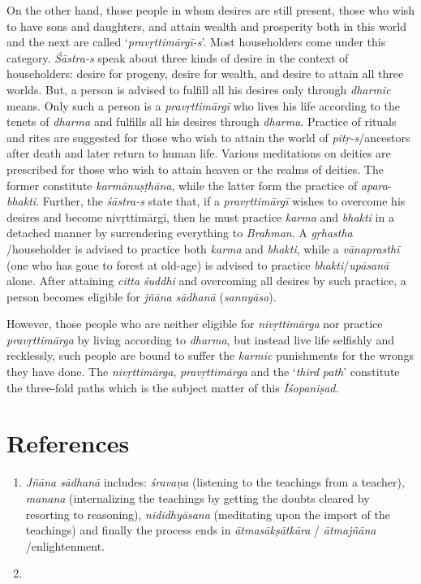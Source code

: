 On the other hand, those people in whom desires are still present, those who wish to have sons and daughters, and attain wealth and prosperity both in this world and the next are called `\emph{pravṛttimārgī-s}'. Most householders come under this category. \emph{Śāstra-s} speak about three kinds of desire in the context of householders: desire for progeny, desire for wealth, and desire to attain all three worlds. But, a person is advised to fulfill all his desires only through \emph{dharmic} means. Only such a person is a \emph{pravṛttimārgī} who lives his life according to the tenets of \emph{dharma} and fulfills all his desires through \emph{dharma}. Practice of rituals and rites are suggested for those who wish to attain the world of \emph{pitṛ-s}/ancestors after death and later return to human life. Various meditations on deities are prescribed for those who wish to attain heaven or the realms of deities. The former constitute \emph{karmānuṣṭhāna}, while the latter form the practice of \emph{apara}-\emph{bhakti}. Further, the \emph{śāstra-s} state that, if a \emph{pravṛttimārgī} wishes to overcome his desires and become nivṛttimārgī, then he must practice \emph{karma} and \emph{bhakti} in a detached manner by surrendering everything to \emph{Brahman}. A \emph{gṛhastha} /householder is advised to practice both \emph{karma} and \emph{bhakti}, while a \emph{vānaprasthī} (one who has gone to forest at old-age) is advised to practice \emph{bhakti}/\emph{upāsanā} alone. After attaining \emph{citta} \emph{śuddhi} and overcoming all desires by such practice, a person becomes eligible for \emph{jñāna} \emph{sādhanā} (\emph{sannyāsa}).

However, those people who are neither eligible for \emph{nivṛttimārga} nor practice \emph{pravṛttimārga} by living according to \emph{dharma}, but instead live life selfishly and recklessly, such people are bound to suffer the \emph{karmic} punishments for the wrongs they have done. The \emph{nivṛttimārga}, \emph{pravṛttimārga} and the `\emph{third} \emph{path}' constitute the three-fold paths which is the subject matter of this \emph{Īśopaniṣad}.

\section*{References}

\begin{enumerate}
\item
  \emph{Jñāna} \emph{sādhanā} includes: \emph{śravaṇa} (listening to the teachings from a teacher), \emph{manana} (internalizing the teachings by getting the doubts cleared by resorting to reasoning), \emph{nididhyāsana} (meditating upon the import of the teachings) and finally the process ends in \emph{ātmasākṣātkāra} / \emph{ātmajñāna} /enlightenment.
\item
\end{enumerate}
